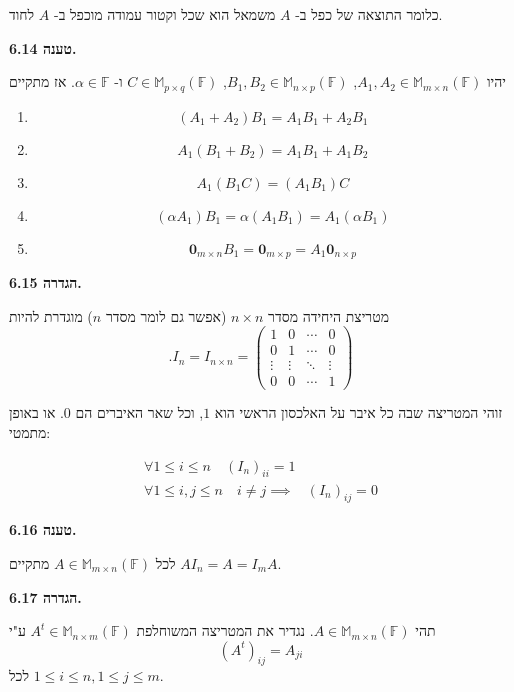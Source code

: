 \documentclass[12pt]{report}
\theoremstyle{plain}
\theoremstyle{definition}
\newcommand{\F}{\mathbb{F}}
\newcommand{\M}{\mathbb{M}}
\newcommand{\0}{\mathbf{0}}
\begin{document}
כלומר התוצאה של כפל ב-
$A$
משמאל הוא שכל וקטור עמודה 
מוכפל ב-
$A$
לחוד.
\bigskip
\bigskip

\noindent\textbf{טענה 6.14.}

יהיו
$A_1,A_2\in\M_{m\times n}(\F)$,
$B_1,B_2\in\M_{n\times p}(\F)$,
$C\in\M_{p\times q}(\F)$
ו-
$\alpha\in\F$.
אז מתקיים

\begin{enumerate}[label=\alph*.]
\item 
$$
(A_1+A_2)B_1=A_1B_1+A_2B_1
$$


\item 
$$
A_1(B_1+B_2)=A_1B_1+A_1B_2
$$


\item 
$$
A_1(B_1C)=(A_1B_1)C
$$


\item 
$$
(\alpha A_1)B_1=\alpha(A_1B_1)=A_1(\alpha B_1)
$$


\item 
$$
\0_{m\times n} B_1=\0_{m\times p}=A_1\0_{n\times p}
$$


\end{enumerate}
\bigskip
\bigskip

\noindent\textbf{הגדרה 6.15.}

מטריצת היחידה מסדר 
$n\times n$
(אפשר גם לומר מסדר $n$)
מוגדרת להיות
$$
.I_n=I_{n\times n}=
\begin{pmatrix}
1 &0 &\cdots &0\\
0 &1 &\cdots &0\\
\vdots &\vdots &\ddots &\vdots\\
0 &0 &\cdots &1
\end{pmatrix}
$$

זוהי המטריצה שבה כל איבר על האלכסון הראשי הוא
$1$,
וכל שאר האיברים הם
$0$. 
או באופן מתמטי:

$$
\begin{aligned}
\forall 1\leq i\leq n \quad (I_n)_{ii}=1 \\
\forall 1\leq i,j\leq n  \quad i\neq j \implies &(I_n)_{ij}=0
\end{aligned}
$$
\bigskip
\bigskip

\noindent\textbf{טענה 6.16.}

לכל 
$A\in\M_{m\times n}(\F)$
מתקיים
$AI_n=A=I_m A$.
\bigskip
\bigskip

\noindent\textbf{הגדרה 6.17.}

תהי
$A\in\M_{m\times n}(\F)$. 
נגדיר את המטריצה המשוחלפת
$A^t\in\M_{n\times m}(\F)$
ע"י
$$
(A^t)_{ij}=A_{ji}
$$
לכל
$1\leq i\leq n,1\leq j\leq m$.
\bigskip
\bigskip
\end{document}
